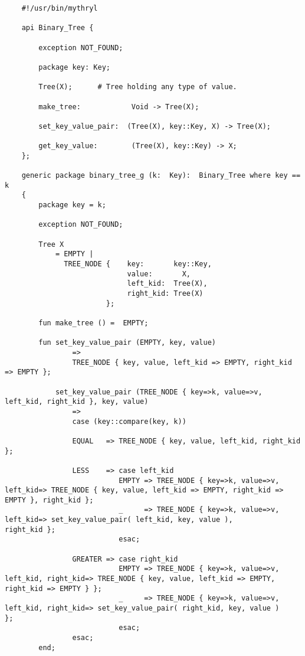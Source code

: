 \begin{verbatim}
    #!/usr/bin/mythryl

    api Binary_Tree {

        exception NOT_FOUND;

        package key: Key;

        Tree(X);      # Tree holding any type of value.

        make_tree:            Void -> Tree(X);

        set_key_value_pair:  (Tree(X), key::Key, X) -> Tree(X);

        get_key_value:        (Tree(X), key::Key) -> X;
    };    

    generic package binary_tree_g (k:  Key):  Binary_Tree where key == k
    {
        package key = k;

        exception NOT_FOUND;

        Tree X
            = EMPTY |
              TREE_NODE {    key:       key::Key,
                             value:       X,
                             left_kid:  Tree(X),
                             right_kid: Tree(X)
                        };

        fun make_tree () =  EMPTY;

        fun set_key_value_pair (EMPTY, key, value)
                =>
                TREE_NODE { key, value, left_kid => EMPTY, right_kid => EMPTY };

            set_key_value_pair (TREE_NODE { key=>k, value=>v, left_kid, right_kid }, key, value)
                =>
                case (key::compare(key, k))

                EQUAL   => TREE_NODE { key, value, left_kid, right_kid };

                LESS    => case left_kid
                           EMPTY => TREE_NODE { key=>k, value=>v, left_kid=> TREE_NODE { key, value, left_kid => EMPTY, right_kid => EMPTY }, right_kid };
                           _     => TREE_NODE { key=>k, value=>v, left_kid=> set_key_value_pair( left_kid, key, value ),                     right_kid };
                           esac; 

                GREATER => case right_kid
                           EMPTY => TREE_NODE { key=>k, value=>v, left_kid, right_kid=> TREE_NODE { key, value, left_kid => EMPTY, right_kid => EMPTY } };
                           _     => TREE_NODE { key=>k, value=>v, left_kid, right_kid=> set_key_value_pair( right_kid, key, value )                    };
                           esac; 
                esac;
        end;


\end{verbatim}
